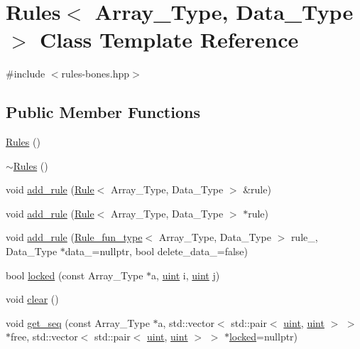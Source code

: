 \hypertarget{class_rules}{}\section{Rules$<$ Array\+\_\+\+Type, Data\+\_\+\+Type $>$ Class Template Reference}
\label{class_rules}


{\ttfamily \#include $<$rules-\/bones.\+hpp$>$}

\subsection*{Public Member Functions}
\begin{DoxyCompactItemize}
\item 
\hyperlink{class_rules_aa78e9abf82ed8a0e4320d570191c8968}{Rules} ()
\item 
\hyperlink{class_rules_aa76d96c2316bc4a2a26bf4ec7b8d9463}{$\sim$\+Rules} ()
\item 
void \hyperlink{class_rules_a60583152fddcb11178dcf3d02a924d7c}{add\+\_\+rule} (\hyperlink{class_rule}{Rule}$<$ Array\+\_\+\+Type, Data\+\_\+\+Type $>$ \&rule)
\item 
void \hyperlink{class_rules_abd60b1d381ad0c8a772e4d81264bbe0a}{add\+\_\+rule} (\hyperlink{class_rule}{Rule}$<$ Array\+\_\+\+Type, Data\+\_\+\+Type $>$ $\ast$rule)
\item 
void \hyperlink{class_rules_abbc63747014445b538384bb500464bb5}{add\+\_\+rule} (\hyperlink{typedefs_8hpp_a2e147c9c0e8b65be614c98a5dd400d5c}{Rule\+\_\+fun\+\_\+type}$<$ Array\+\_\+\+Type, Data\+\_\+\+Type $>$ rule\+\_\+, Data\+\_\+\+Type $\ast$data\+\_\+=nullptr, bool delete\+\_\+data\+\_\+=false)
\item 
bool \hyperlink{class_rules_a4e08a6b3d8b536cb1717c62192a91537}{locked} (const Array\+\_\+\+Type $\ast$a, \hyperlink{typedefs_8hpp_a91ad9478d81a7aaf2593e8d9c3d06a14}{uint} i, \hyperlink{typedefs_8hpp_a91ad9478d81a7aaf2593e8d9c3d06a14}{uint} j)
\item 
void \hyperlink{class_rules_a135a15d3ff70d4350d76a15f8e85f7df}{clear} ()
\item 
void \hyperlink{class_rules_a7b8f29955ec52f49808d7ea1cd4eaf5e}{get\+\_\+seq} (const Array\+\_\+\+Type $\ast$a, std\+::vector$<$ std\+::pair$<$ \hyperlink{typedefs_8hpp_a91ad9478d81a7aaf2593e8d9c3d06a14}{uint}, \hyperlink{typedefs_8hpp_a91ad9478d81a7aaf2593e8d9c3d06a14}{uint} $>$ $>$ $\ast$free, std\+::vector$<$ std\+::pair$<$ \hyperlink{typedefs_8hpp_a91ad9478d81a7aaf2593e8d9c3d06a14}{uint}, \hyperlink{typedefs_8hpp_a91ad9478d81a7aaf2593e8d9c3d06a14}{uint} $>$ $>$ $\ast$\hyperlink{class_rules_a4e08a6b3d8b536cb1717c62192a91537}{locked}=nullptr)
\end{DoxyCompactItemize}


